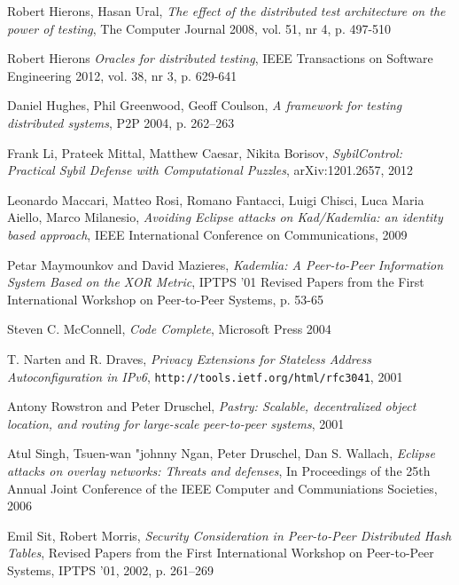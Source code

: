 \begin{thebibliography}{99}
  Robert Hierons, Hasan Ural,
  \textit{The effect of the distributed test architecture on the power of testing},
  The Computer Journal 2008, vol. 51, nr 4, p. 497-510

  Robert Hierons
  \textit{Oracles for distributed testing},
  IEEE Transactions on Software Engineering 2012, vol. 38, nr 3, p. 629-641

  Daniel Hughes, Phil Greenwood, Geoff Coulson,
  \textit{A framework for testing distributed systems},
  P2P 2004, p. 262--263

Frank Li, Prateek Mittal, Matthew Caesar, Nikita Borisov,
\textit{SybilControl: Practical Sybil Defense with Computational Puzzles},
arXiv:1201.2657, 2012

  Leonardo Maccari, Matteo Rosi, Romano Fantacci, Luigi Chisci, Luca Maria
  Aiello, Marco Milanesio,
  \textit{Avoiding Eclipse attacks on Kad/Kademlia: an identity based approach},
   IEEE International Conference on Communications, 2009

  Petar Maymounkov and David Mazieres,
  \textit{Kademlia: A Peer-to-Peer Information System Based on the XOR Metric},
  IPTPS '01 Revised Papers from the First International Workshop on Peer-to-Peer
  Systems, p. 53-65

  Steven C. McConnell,
  \textit{Code Complete},
  Microsoft Press 2004

  T. Narten and R. Draves,
  \textit{Privacy Extensions for Stateless Address Autoconfiguration in IPv6},
  \texttt{http://tools.ietf.org/html/rfc3041},
  2001

  Antony Rowstron and Peter Druschel,
  \textit{Pastry: Scalable, decentralized object location, and routing for
  large-scale peer-to-peer systems}, 2001

  Atul Singh, Tsuen-wan "johnny Ngan, Peter Druschel, Dan S. Wallach,
  \textit{Eclipse attacks on overlay networks: Threats and defenses},
  In Proceedings of the 25th Annual Joint Conference of the IEEE Computer and
  Communiations Societies, 2006

  Emil Sit, Robert Morris,
  \textit{Security Consideration in Peer-to-Peer Distributed Hash Tables},
  Revised Papers from the First International Workshop on Peer-to-Peer Systems,
  IPTPS '01, 2002, p. 261--269


\end{thebibliography}
